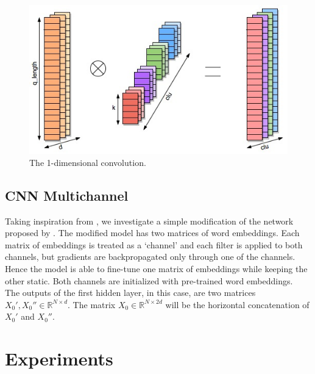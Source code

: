 \documentclass[10pt,twocolumn,letterpaper]{article}
\begin{document}
\begin{figure}[t]
\begin{center}
\includegraphics[width=0.8\linewidth]{img/conv1d.jpg}
\end{center}
\caption{The 1-dimensional convolution.}
\label{fig:conv}
\end{figure}
\subsection{CNN Multichannel}    \label{multichannel}
Taking inspiration from \cite{kim2014convolutional}, we investigate a simple modification of the network proposed by \cite{bogdanova2015detecting}. The modified model has two matrices of word embeddings. Each matrix of embeddings is treated as a ‘channel’ and each filter is applied to both channels, but gradients are backpropagated only through one of the channels. Hence the model is able to fine-tune one matrix of embeddings while keeping the other static. Both channels are initialized with pre-trained word embeddings. \\
The outputs of the first hidden layer, in this case, are two matrices $X_0', X_0'' \in \mathbb{R}^{N \times d}$. The matrix $X_0 \in \mathbb{R}^{N \times 2d}$ will be the horizontal concatenation of $X_0'$ and $X_0''$.
  
\section{Experiments}
\end{document}

